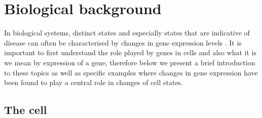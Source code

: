 
\section{Biological background}
\label{sec:biol-backgr}

In biological systems, distinct states and especially states that are indicative of disease can often be characterised by changes in gene expression levels \citep{DeRisi:1997dw,Spellman:1998wj,Eisen:1999uw, Brown:1999bk}. It is important to first understand the role played by genes in cells and also what it is we mean by expression of a gene, therefore below we present a brief introduction to these topics as well as specific examples where changes in gene expression have been found to play a central role in changes of cell states.

\subsection{The cell}
\label{sec:cell}

